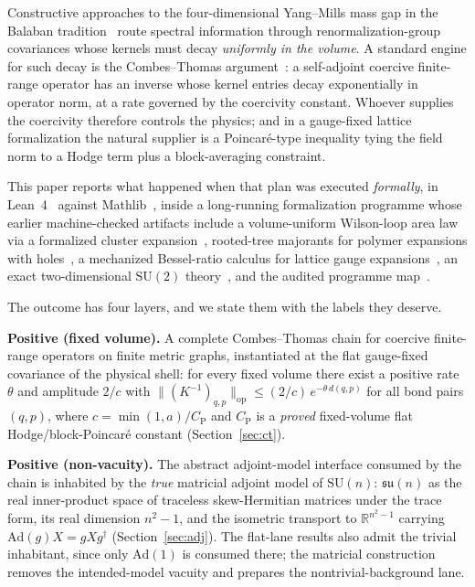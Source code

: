 \documentclass[11pt]{article}
\theoremstyle{definition}
\newcommand{\R}{\mathbb{R}}
\newcommand{\SU}{\mathrm{SU}}
\newcommand{\su}{\mathfrak{su}}
\newcommand{\CP}{C_{\mathrm{P}}}
\begin{document}
Constructive approaches to the four-dimensional Yang--Mills mass gap in
the Balaban tradition~\cite{Balaban84a,Balaban84b} route spectral
information through renormalization-group covariances whose kernels must
decay \emph{uniformly in the volume}.  A standard engine for such decay
is the Combes--Thomas argument~\cite{CombesThomas}: a self-adjoint
coercive finite-range operator has an inverse whose kernel entries decay
exponentially in operator norm, at a rate governed by the coercivity
constant.  Whoever supplies
the coercivity therefore controls the physics; and in a gauge-fixed
lattice formalization the natural supplier is a Poincar\'e-type
inequality tying the field norm to a Hodge term plus a block-averaging
constraint.

This paper reports what happened when that plan was executed
\emph{formally}, in Lean~4~\cite{Lean4} against
Mathlib~\cite{mathlib}, inside a long-running formalization programme
whose earlier machine-checked artifacts include a volume-uniform
Wilson-loop area law via a formalized cluster
expansion~\cite{ErikssonVU}, rooted-tree majorants for polymer expansions
with holes~\cite{ErikssonHoles}, a mechanized Bessel-ratio calculus for
lattice gauge expansions~\cite{ErikssonC4,ErikssonC3,ErikssonC2}, an
exact two-dimensional $\SU(2)$ theory~\cite{Eriksson2D}, and the audited
programme map~\cite{ErikssonMap}.

The outcome has four layers, and we state them with the labels they
deserve.

\textbf{Positive (fixed volume).}  A complete Combes--Thomas chain
for coercive finite-range operators on finite metric graphs,
instantiated at the flat gauge-fixed covariance of the physical shell:
for every fixed volume there exist a positive rate $\theta$ and amplitude
$2/c$ with
$\bigl\|(K^{-1})_{q,p}\bigr\|_{\mathrm{op}} \le (2/c)\,e^{-\theta\, d(q,p)}$
for all bond pairs $(q,p)$,
where $c = \min(1,a)/\CP$ and $\CP$ is a \emph{proved} fixed-volume flat
Hodge/block-Poincar\'e constant (Section~\ref{sec:ct}).

\textbf{Positive (non-vacuity).}  The abstract adjoint-model interface
consumed by the chain is inhabited by the \emph{true} matricial adjoint
model of $\SU(n)$: $\su(n)$ as the real inner-product space of traceless
skew-Hermitian matrices under the trace form, its real dimension
$n^2-1$, and the isometric transport to
$\R^{n^2-1}$ carrying $\mathrm{Ad}(g)X = gXg^{\dagger}$
(Section~\ref{sec:adj}).  The flat-lane results also admit the trivial
inhabitant, since only $\mathrm{Ad}(1)$ is consumed there; the matricial
construction removes the intended-model vacuity and prepares the
nontrivial-background lane.
\end{document}
